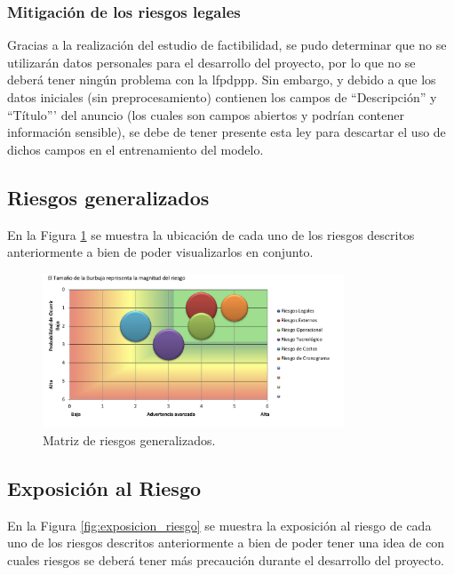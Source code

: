 \subsubsection{Mitigación de los riesgos legales}

Gracias a la realización del estudio de factibilidad, se pudo determinar que
no se utilizarán datos personales para el desarrollo del proyecto, por lo que
no se deberá tener ningún problema con la \acrfull{lfpdppp}. Sin embargo, y debido a que
los datos iniciales (sin preprocesamiento) contienen los campos de ``Descripción'' y ``Título''' del anuncio (los cuales
son campos abiertos y podrían contener información sensible), se debe de tener
presente esta ley para descartar el uso de dichos campos en el entrenamiento del modelo.

\subsection{Riesgos generalizados}

En la Figura \ref{fig:riesgos_generalizados} se muestra la ubicación de cada
uno de los riesgos descritos anteriormente a bien de poder visualizarlos en
conjunto.

\begin{figure}[H]
  \centering
  \includegraphics[width=0.8\textwidth]{imagenes/03-analisis/analisis-riesgos/riesgos-generalizados.png}
  \caption{Matriz de riesgos generalizados.}
  \label{fig:riesgos_generalizados}
\end{figure}

\subsection{Exposición al Riesgo}

En la Figura \ref{fig:exposicion_riesgo} se muestra la exposición al riesgo de
cada uno de los riesgos descritos anteriormente a bien de poder tener una idea
de con cuales riesgos se deberá tener más precaución durante el desarrollo
del proyecto.

